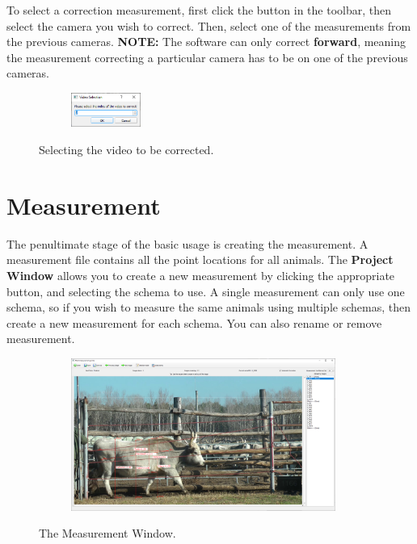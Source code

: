 \documentclass[10pt,a4paper,oneside]{report}             %
\begin{document}
To select a correction measurement, first click the button in the toolbar, then select the camera you wish to correct. Then, select one of the measurements from the previous cameras. \textbf{NOTE:} The software can only correct \textbf{forward}, meaning the measurement correcting a particular camera has to be on one of the previous cameras.

\begin{figure}[H]
	\centering
	\begin{subfigure}{\textwidth}
		\centering 
		\includegraphics[width=0.25\textwidth]{./images/SelectVideoCorr.png}
	\end{subfigure}
	\caption[]
	{\small  Selecting the video to be corrected.}
\end{figure} 

\section{Measurement}

The penultimate stage of the basic usage is creating the measurement. A measurement file contains all the point locations for all animals. The \textbf{Project Window} allows you to create a new measurement by clicking the appropriate button, and selecting the schema to use. A single measurement can only use one schema, so if you wish to measure the same animals using multiple schemas, then create a new measurement for each schema. You can also rename or remove measurement. 

\begin{figure}[H]
	\centering
	\begin{subfigure}{\textwidth}
		\centering 
		\includegraphics[width=0.95\textwidth]{./images/MeasW.png}
	\end{subfigure}
	\caption[]
	{\small  The Measurement Window.}
\end{figure} 
\end{document}

